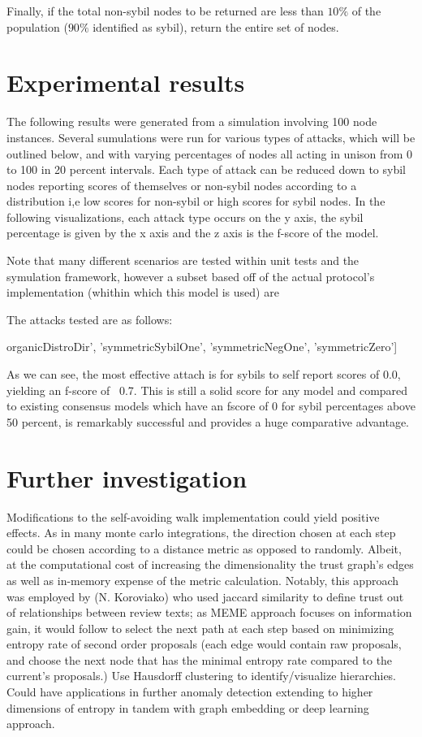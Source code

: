 \documentclass{article}
\begin{document}
Finally, if the total non-sybil nodes to be returned are less than $10\%$ of the population ($90\%$ identified as sybil), return the entire set of nodes.

\section{Experimental results}
The following results were generated from a simulation involving 100 node instances. Several sumulations were run for various types of attacks, which will be outlined below, and with varying percentages of nodes all acting in unison from 0 to 100 in 20 percent intervals. Each type of attack can be reduced down to sybil nodes reporting scores of themselves or non-sybil nodes according to a distribution i,e low scores for non-sybil or high scores for sybil nodes. In the following visualizations, each attack type occurs on the y axis, the sybil percentage is given by the x axis and the z axis is the f-score of the model.

Note that many different scenarios are tested within unit tests and the symulation framework, however a subset based off of the actual protocol's implementation (whithin which this model is used) are 

The attacks tested are as follows:

organicDistroDir',
                 'symmetricSybilOne', 'symmetricNegOne', 'symmetricZero']

As we can see, the most effective attach is for sybils to self report scores of 0.0, yielding an f-score of ~0.7. This is still a solid score for any model and compared to existing consensus models which have an fscore of 0 for sybil percentages above 50 percent, is remarkably successful and provides a huge comparative advantage.

\section{Further investigation}
	Modifications to the self-avoiding walk implementation could yield positive effects. As in many monte carlo integrations, the direction chosen at each step could be chosen according to a distance metric as opposed to randomly. Albeit, at the computational cost of increasing the dimensionality the trust graph’s edges as well as in-memory expense of the metric calculation. Notably, this approach was employed by (N. Koroviako) who used jaccard similarity to define trust out of relationships between review texts; as MEME approach focuses on information gain, it would follow to select the next path at each step based on minimizing entropy rate of second order proposals (each edge would contain raw proposals, and choose the next node that has the minimal entropy rate compared to the current’s proposals.)
	Use Hausdorff clustering to identify/visualize hierarchies. Could have applications in further anomaly detection extending to higher dimensions of entropy in tandem with graph embedding or deep learning approach.
\end{document}
